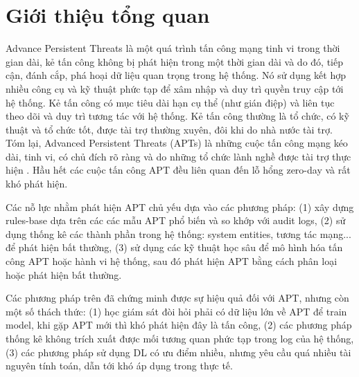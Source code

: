 \section{Giới thiệu tổng quan}

Advance Persistent Threats là một quá trình tấn công mạng tinh vi trong thời gian dài, kẻ tấn công không bị phát hiện trong một thời gian dài và do đó, tiếp cận, đánh cắp, phá hoại dữ liệu quan trọng trong hệ thống. Nó sử dụng kết hợp nhiều công cụ và kỹ thuật phức tạp để xâm nhập và duy trì quyền truy cập tới hệ thống. Kẻ tấn công có mục tiêu dài hạn cụ thể (như gián điệp) và liên tục theo dõi và duy trì tương tác với hệ thống. Kẻ tấn công thường là tổ chức, có kỹ thuật và tổ chức tốt, được tài trợ thường xuyên, đôi khi do nhà nước tài trợ. Tóm lại, Advanced Persistent Threats (APTs) là những cuộc tấn công mạng kéo dài, tinh vi, có chủ đích rõ ràng và do những tổ chức lành nghề được tài trợ thực hiện \cite{alshamrani2019survey}. Hầu hết các cuộc tấn công APT đều liên quan đến lỗ hổng zero-day và rất khó phát hiện. 

Các nỗ lực nhằm phát hiện APT chủ yếu dựa vào các phương pháp: (1) xây dựng rules-base dựa trên các các mẫu APT phổ biến và so khớp với audit logs, (2) sử dụng thống kê các thành phần trong hệ thống: system entities, tương tác mạng... để phát hiện bất thường, (3) sử dụng các kỹ thuật học sâu để mô hình hóa tấn công APT hoặc hành vi hệ thống, sau đó phát hiện APT bằng cách phân loại hoặc phát hiện bất thường.

Các phương pháp trên đã chứng minh được sự hiệu quả đối với APT, nhưng còn một số thách thức: (1) học giám sát đòi hỏi phải có dữ liệu lớn về APT để train model, khi gặp APT mới thì khó phát hiện đây là tấn công, (2) các phương pháp thống kê không trích xuất được mối tương quan phức tạp trong log của hệ thống, (3) các phương pháp sử dụng DL có ưu điểm nhiều, nhưng yêu cầu quá nhiều tài nguyên tính toán, dẫn tới khó áp dụng trong thực tế.